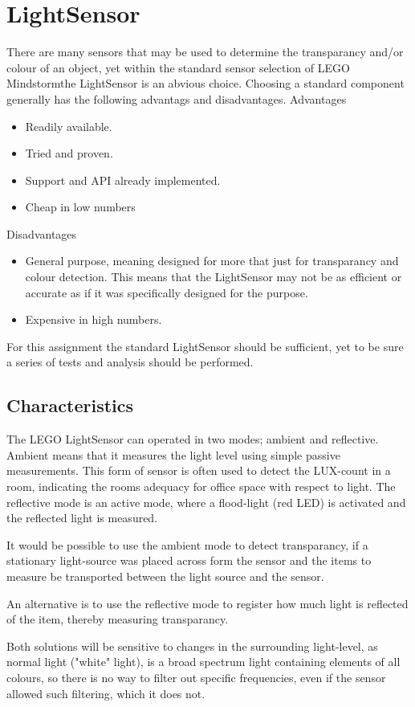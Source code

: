 \documentclass[11pt,a4]{article}
\begin{document}
\section{LightSensor}
There are many sensors that may be used to determine the transparancy and/or colour of an object, yet within the standard sensor selection of LEGO Mindstorm\textregistered  the LightSensor is an abvious choice. Choosing a standard component generally has the following advantags and disadvantages.
\noindent Advantages
\begin{itemize}
    \item Readily available.
    \item Tried and proven.
    \item Support and API already implemented.
    \item Cheap in low numbers
\end{itemize}
\noindent Disadvantages
\begin{itemize}
    \item General purpose, meaning designed for more that just for transparancy and colour detection. This means that the LightSensor may not be as efficient or accurate as if it was specifically designed for the purpose.
    \item Expensive in high numbers.
\end{itemize}
For this assignment the standard LightSensor should be sufficient, yet to be sure a series of tests and analysis should be performed.
\subsection{Characteristics}
The LEGO LightSensor can operated in two modes; ambient and reflective. Ambient means that it measures the light level using simple passive measurements. This form of sensor is often used to detect the LUX-count in a room, indicating the rooms adequacy for office space with respect to light. The reflective mode is an active mode, where a flood-light (red LED) is activated and the reflected light is measured.

It would be possible to use the ambient mode to detect transparancy, if a stationary light-source was placed across form the sensor and the items to measure be transported between the light source and the sensor.

An alternative is to use the reflective mode to register how much light is reflected of the item, thereby measuring transparancy.

Both solutions will be sensitive to changes in the surrounding light-level, as normal light ("white" light), is a broad spectrum light containing elements of all colours, so there is no way to filter out specific frequencies, even if the sensor allowed such filtering, which it does not. 
\end{document}
